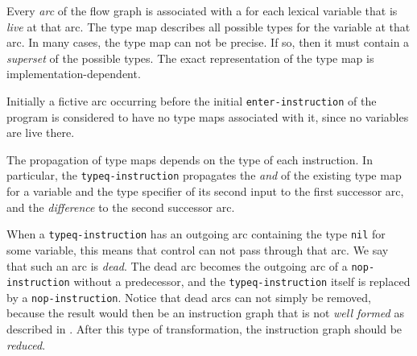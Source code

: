Every \emph{arc} of the flow graph is associated with a  for each lexical variable that is \emph{live} at that arc.  The
type map describes all possible types for the variable at that arc.
In many cases, the type map can not be precise.  If so, then it must
contain a \emph{superset} of the possible types.  The exact
representation of the type map is implementation-dependent. 

Initially a fictive arc occurring before the initial
\texttt{enter-instruction} of the program is considered to have no
type maps associated with it, since no variables are live there.  

The propagation of type maps depends on the type of each instruction.
In particular, the \texttt{typeq-instruction} propagates the
\emph{and} of the existing type map for a variable and the type
specifier of its second input to the first successor arc, and the
\emph{difference} to the second successor arc.  

When a \texttt{typeq-instruction} has an outgoing arc containing the
type \texttt{nil} for some variable, this means that control can not
pass through that arc.  We say that such an arc is \emph{dead}. 
The dead arc becomes the outgoing arc of a
\texttt{nop-instruction} without a predecessor, and the
\texttt{typeq-instruction} itself is replaced by a
\texttt{nop-instruction}.%
Notice that dead arcs can not simply be removed, because the result
would then be an instruction graph that is not \emph{well formed} as
described in .  After this type of transformation,
the instruction graph should be
\emph{reduced}.  

